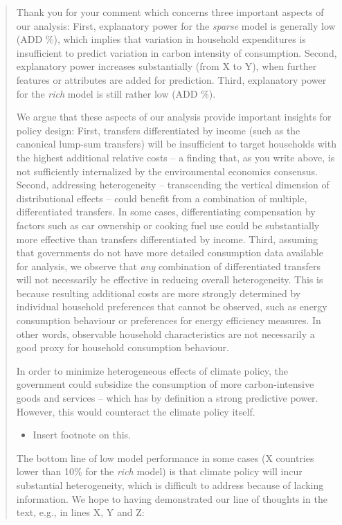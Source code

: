 \documentclass[11pt]{article}
\newenvironment{response}
{\begin{quote}\color{black}}
{\end{quote}}
\begin{document}
\begin{response}
    Thank you for your comment which concerns three important aspects of our analysis: First, explanatory power for the \textit{sparse} model is generally low (ADD \%), which implies that variation in household expenditures is insufficient to predict variation in carbon intensity of consumption. Second, explanatory power increases substantially (from X to Y), when further features or attributes are added for prediction. Third, explanatory power for the \textit{rich} model is still rather low (ADD \%).

    We argue that these aspects of our analysis provide important insights for policy design: First, transfers differentiated by income (such as the canonical lump-sum transfers) will be insufficient to target households with the highest additional relative costs -- a finding that, as you write above, is not sufficiently internalized by the environmental economics consensus. Second, addressing heterogeneity -- transcending the vertical dimension of distributional effects -- could benefit from a combination of multiple, differentiated transfers. In some cases, differentiating compensation by factors such as car ownership or cooking fuel use could be substantially more effective than transfers differentiated by income. Third, assuming that governments do not have more detailed consumption data available for analysis, we observe that \textit{any} combination of differentiated transfers will not necessarily be effective in reducing overall heterogeneity. This is because resulting additional costs are more strongly determined by individual household preferences that cannot be observed, such as energy consumption behaviour or preferences for energy efficiency measures. In other words, observable household characteristics are not necessarily a good proxy for household consumption behaviour. 

    In order to minimize heterogeneous effects of climate policy, the government could subsidize the consumption of more carbon-intensive goods and services -- which has by definition a strong predictive power. However, this would counteract the climate policy itself.

    \begin{itemize}
        \item Insert footnote on this.
    \end{itemize}

    The bottom line of low model performance in some cases (X countries lower than 10\% for the \textit{rich} model) is that climate policy will incur substantial heterogeneity, which is difficult to address because of lacking information. We hope to having demonstrated our line of thoughts in the text, e.g., in lines X, Y and Z:
  

\end{response}
\end{document}
